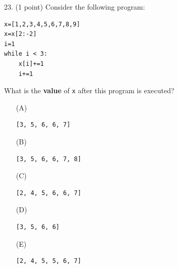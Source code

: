 \documentclass{article}
\begin{document}
\noindent
\begin{minipage}{\textwidth}
23. (1 point)
Consider the following program:
\begin{verbatim}
x=[1,2,3,4,5,6,7,8,9]
x=x[2:-2]
i=1
while i < 3:
    x[i]+=1
    i+=1
\end{verbatim}
What is the \textbf{value} of \texttt{x} after this program is executed?

\begin{enumerate}
\item[(A)]
\begin{verbatim}[3, 5, 6, 6, 7]\end{verbatim}

\item[(B)]
\begin{verbatim}[3, 5, 6, 6, 7, 8]\end{verbatim}

\item[(C)]
\begin{verbatim}[2, 4, 5, 6, 6, 7]\end{verbatim}

\item[(D)]
\begin{verbatim}[3, 5, 6, 6]\end{verbatim}

\item[(E)]
\begin{verbatim}[2, 4, 5, 5, 6, 7]\end{verbatim}

\end{enumerate}
\end{minipage}
\vspace{2em}
\filbreak\vfil{}\vfilneg
\end{document}
